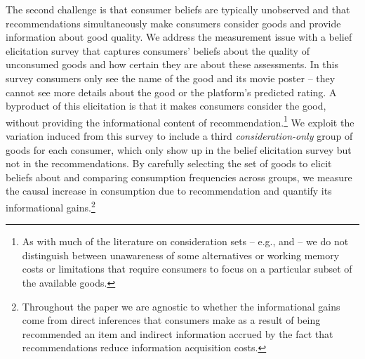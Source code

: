 \documentclass[12pt]{article}
\theoremstyle{newtheorem}
\begin{document}
The second challenge is that consumer beliefs are typically unobserved and that recommendations simultaneously make consumers consider goods and provide information about good quality. 
We address the measurement issue with a belief elicitation survey that captures consumers' beliefs about the quality of unconsumed goods and how certain they are about these assessments. 
In this survey consumers only see the name of the good and its movie poster -- they cannot see more details about the good or the platform's predicted rating. A byproduct of this elicitation is that it makes consumers consider the good, without providing the informational content of recommendation.\footnote{
    As with much of the literature on consideration sets -- e.g., \citet{MasatliogluNakajimaOzbay2012AER} and \citet{ManziniMariotti2014Ecta} -- we do not distinguish between unawareness of some alternatives or working memory costs or limitations that require consumers to focus on a particular subset of the available goods.
} 
We exploit the variation induced from this survey to include a third \emph{consideration-only} group of goods for each consumer, which only show up in the belief elicitation survey but not in the recommendations. By carefully selecting the set of goods to elicit beliefs about and comparing consumption frequencies across groups, we measure the causal increase in consumption due to recommendation and quantify its informational gains.\footnote{
    Throughout the paper we are agnostic to whether the informational gains come from direct inferences that consumers make as a result of being recommended an item and indirect information accrued by the fact that recommendations reduce information acquisition costs.
}
\end{document}
